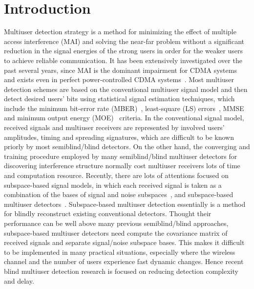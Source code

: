 \documentclass[a4paper,10pt,fleqn, twocolumn]{IEEETran}
\begin{document}
\section{Introduction}
Multiuser detection strategy is a method for minimizing the effect
of multiple access interference (MAI) and solving the near-far
problem without a significant reduction in the signal energies of
the strong users in order for the weaker users to achieve reliable
communication. It has been extensively investigated over the past
several years, since MAI is the dominant impairment for CDMA
systems and exists even in perfect power-controlled CDMA
systems~\cite{Verd86,Verd89,Lupa89,Madh94,Honi95,Wang98,Verd98,Wang99}.
Most multiuser detection schemes are based on the conventional
multiuser signal model and then detect desired users' bits using
statistical signal estimation techniques, which include the
minimum bit-error rate (MBER)~\cite{Verd86,Verd89}, least-square
(LS) errors~\cite{Lupa89}, MMSE~\cite{Lupa89,Madh94,Honi95} and
minimum output energy (MOE)~\cite{Honi95} criteria. In the
conventional signal model, received signals and multiuser
receivers are represented by involved users' amplitudes, timing
and spreading signatures, which are difficult to be known priorly
by most semiblind/blind detectors. On the other hand, the
converging and training procedure employed by many semiblind/blind
multiuser detectors for discovering interference structure
normally cost multiuser receivers lots of time and computation
resource. Recently, there are lots of attentions focused on
subspace-based signal models, in which each received signal is
taken as a combination of the bases of signal and noise
subspaces~\cite{Yang95,Liu96,Torl97}, and subspace-based multiuser
detectors~\cite{Wang98,Wang99}. Subspace-based multiuser detection
essentially is a method for blindly reconstruct existing
conventional detectors. Thought their performance can be well
above many previous semiblind/blind approaches, subspace-based
multiuser detectors need compute the covariance matrix of received
signals and separate signal/noise subspace bases. This makes it
difficult to be implemented in many practical situations,
especially where the wireless channel and the number of users
experience fast dynamic changes. Hence recent blind multiuser
detection research is focused on reducing detection complexity and
delay.
\end{document}
